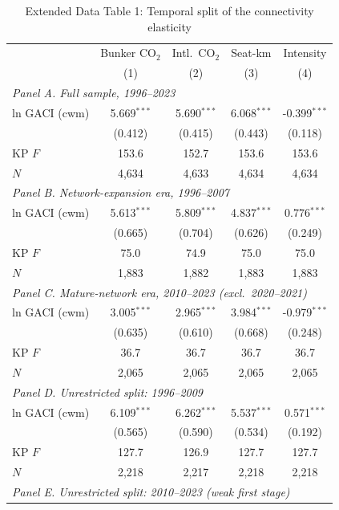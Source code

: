 \documentclass[12pt]{article}
\begin{document}
\begin{table}[htbp]
\centering
\begin{threeparttable}
\caption{Extended Data Table 1: Temporal split of the connectivity elasticity}
\label{tab:temporal}
\footnotesize
\begin{tabular}{lcccc}
\toprule
 & \multicolumn{1}{c}{Bunker CO$_2$} & \multicolumn{1}{c}{Intl.\ CO$_2$} & \multicolumn{1}{c}{Seat-km} & \multicolumn{1}{c}{Intensity} \\
 & (1) & (2) & (3) & (4) \\
\midrule
\multicolumn{5}{l}{\textit{Panel A. Full sample, 1996--2023}} \\
  ln GACI (cwm) & 5.669$^{***}$ & 5.690$^{***}$ & 6.068$^{***}$ & -0.399$^{***}$ \\
   & (0.412) & (0.415) & (0.443) & (0.118) \\
  KP $F$ & 153.6 & 152.7 & 153.6 & 153.6 \\
  $N$ & 4,634 & 4,633 & 4,634 & 4,634 \\
\midrule
\multicolumn{5}{l}{\textit{Panel B. Network-expansion era, 1996--2007}} \\
  ln GACI (cwm) & 5.613$^{***}$ & 5.809$^{***}$ & 4.837$^{***}$ & 0.776$^{***}$ \\
   & (0.665) & (0.704) & (0.626) & (0.249) \\
  KP $F$ & 75.0 & 74.9 & 75.0 & 75.0 \\
  $N$ & 1,883 & 1,882 & 1,883 & 1,883 \\
\midrule
\multicolumn{5}{l}{\textit{Panel C. Mature-network era, 2010--2023 (excl.\ 2020--2021)}} \\
  ln GACI (cwm) & 3.005$^{***}$ & 2.965$^{***}$ & 3.984$^{***}$ & -0.979$^{***}$ \\
   & (0.635) & (0.610) & (0.668) & (0.248) \\
  KP $F$ & 36.7 & 36.7 & 36.7 & 36.7 \\
  $N$ & 2,065 & 2,065 & 2,065 & 2,065 \\
\midrule
\multicolumn{5}{l}{\textit{Panel D. Unrestricted split: 1996--2009}} \\
  ln GACI (cwm) & 6.109$^{***}$ & 6.262$^{***}$ & 5.537$^{***}$ & 0.571$^{***}$ \\
   & (0.565) & (0.590) & (0.534) & (0.192) \\
  KP $F$ & 127.7 & 126.9 & 127.7 & 127.7 \\
  $N$ & 2,218 & 2,217 & 2,218 & 2,218 \\
\midrule
\multicolumn{5}{l}{\textit{Panel E. Unrestricted split: 2010--2023 (weak first stage)}} \\

\end{tabular}
\end{threeparttable}
\end{table}
\end{document}
